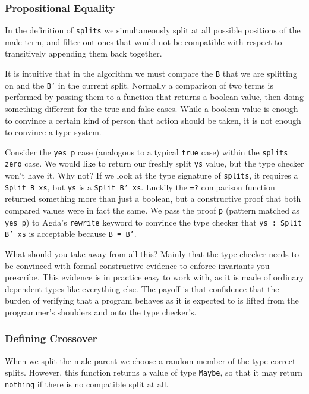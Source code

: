 \documentclass{acm_proc_article-sp}
\begin{document}
\subsubsection{Propositional Equality}

In the definition of \texttt{splits} we simultaneously split at all
possible positions of the male term, and filter out ones that would
not be compatible with respect to transitively appending them back
together.

It is intuitive that in the algorithm we must compare the \texttt{B}
that we are splitting on and the \texttt{B'} in the current
split. Normally a comparison of two terms is performed by passing them
to a function that returns a boolean value, then doing something
different for the true and false cases. While a boolean value is
enough to convince a certain kind of person that action should be
taken, it is not enough to convince a type system.

Consider the \texttt{yes p} case (analogous to a typical \texttt{true}
case) within the \texttt{splits zero} case. We would like to return
our freshly split \texttt{ys} value, but the type checker won't have
it. Why not? If we look at the type signature of \texttt{splits}, it
requires a \texttt{Split B xs}, but \texttt{ys} is a \texttt{Split B'
  xs}. Luckily the \texttt{=?} comparison function returned something
more than just a boolean, but a constructive proof that both compared
values were in fact the same. We pass the proof \texttt{p} (pattern
matched as \texttt{yes p}) to Agda's \texttt{rewrite} keyword to
convince the type checker that \texttt{ys : Split B' xs} is acceptable
because \texttt{B ≡ B'}.

What should you take away from all this? Mainly that the type checker
needs to be convinced with formal constructive evidence to enforce
invariants you prescribe. This evidence is in practice easy to work
with, as it is made of ordinary dependent types like everything
else. The payoff is that confidence that the burden of verifying that
a program behaves as it is expected to is lifted from the programmer's
shoulders and onto the type checker's.

\subsubsection{Defining Crossover}

When we split the male parent we choose a random member of the
type-correct splits. However, this function returns a value of type
\texttt{Maybe}, so that it may return \texttt{nothing} if there is no
compatible split at all.
\end{document}
